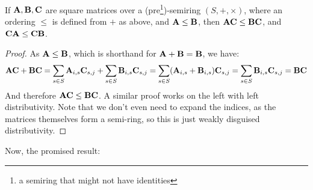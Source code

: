 \documentclass{article}
\begin{document}
	\begin{lemma}
		If $\mathbf A,\mathbf B,\mathbf C$ are square matrices over a (pre\footnote{a semiring that might not have identities})-semiring $(S, +, \times)$, where an ordering $\leq$ is defined from $+$ as above, and $\mathbf A \leq \mathbf B$, then $\mathbf A \mathbf C \leq \mathbf B \mathbf C$, and $\mathbf C \mathbf A \leq \mathbf C \mathbf B$.
	\end{lemma}
	\begin{proof}
		As $\mathbf A \leq \mathbf B$, which is shorthand for $\mathbf A + \mathbf B = \mathbf B$, we have:
		\begin{equation*}
			\mathbf A \mathbf C + \mathbf B \mathbf C = 
			\sum_{s \in S} \mathbf A_{i,s} \mathbf C_{s,j} + \sum_{s \in S} \mathbf B_{i,s} \mathbf C_{s,j}  = 
			\sum_{s \in S} (\mathbf A_{i,s} + \mathbf B_{i,s}) \mathbf C_{s,j} 
				= \sum_{s \in S} \mathbf B_{i,s} \mathbf C_{s,j} 
				= \mathbf B \mathbf C 
		\end{equation*}
		And therefore $\mathbf A \mathbf C \leq \mathbf B \mathbf C$. A similar proof works on the left with left distributivity. Note that we don't even need to expand the indices, as the matrices themselves form a semi-ring, so this is just weakly disguised distributivity.
	\end{proof}
	
	Now, the promised result:
	
\end{document}
